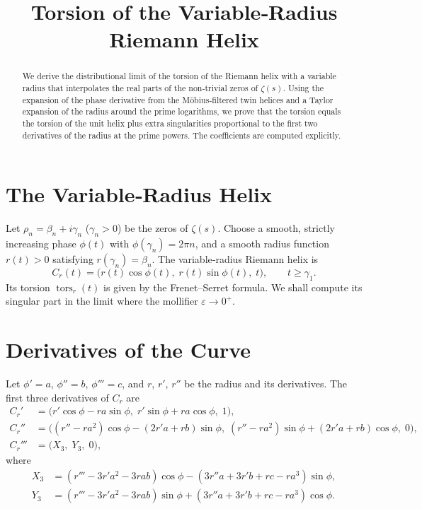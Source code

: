\documentclass[12pt,a4paper]{article}
\title{\bf Torsion of the Variable‑Radius Riemann Helix}
\author{}
\date{}
\newcommand{\tors}{\operatorname{tors}}
\begin{document}
\maketitle

\begin{abstract}
We derive the distributional limit of the torsion of the Riemann helix with a variable radius that interpolates the real parts of the non‑trivial zeros of $\zeta(s)$.  Using the expansion of the phase derivative from the M\"obius‑filtered twin helices and a Taylor expansion of the radius around the prime logarithms, we prove that the torsion equals the torsion of the unit helix plus extra singularities proportional to the first two derivatives of the radius at the prime powers.  The coefficients are computed explicitly.
\end{abstract}

\section{The Variable‑Radius Helix}
Let $\rho_n = \beta_n + i\gamma_n$ ($\gamma_n>0$) be the zeros of $\zeta(s)$.  Choose a smooth, strictly increasing phase $\phi(t)$ with $\phi(\gamma_n)=2\pi n$, and a smooth radius function $r(t)>0$ satisfying $r(\gamma_n)=\beta_n$.  The variable‑radius Riemann helix is
\[
C_r(t) = \bigl( r(t)\cos\phi(t),\; r(t)\sin\phi(t),\; t \bigr), \qquad t \ge \gamma_1 .
\]
Its torsion $\tors_r(t)$ is given by the Frenet–Serret formula.  We shall compute its singular part in the limit where the mollifier $\varepsilon\to0^+$.

\section{Derivatives of the Curve}
Let $\phi' = a$, $\phi'' = b$, $\phi''' = c$, and $r$, $r'$, $r''$ be the radius and its derivatives.  The first three derivatives of $C_r$ are
\begin{align*}
C_r' &= \bigl( r'\cos\phi - r a\sin\phi,\; r'\sin\phi + r a\cos\phi,\; 1 \bigr),\\
C_r'' &= \bigl( (r'' - r a^2)\cos\phi - (2r' a + r b)\sin\phi,\;
               (r'' - r a^2)\sin\phi + (2r' a + r b)\cos\phi,\; 0 \bigr),\\
C_r''' &= \bigl( X_3,\; Y_3,\; 0 \bigr),
\end{align*}
where
\begin{align*}
X_3 &= (r''' - 3r' a^2 - 3r a b)\cos\phi - (3r'' a + 3r' b + r c - r a^3)\sin\phi,\\
Y_3 &= (r''' - 3r' a^2 - 3r a b)\sin\phi + (3r'' a + 3r' b + r c - r a^3)\cos\phi .
\end{align*}
\end{document}
